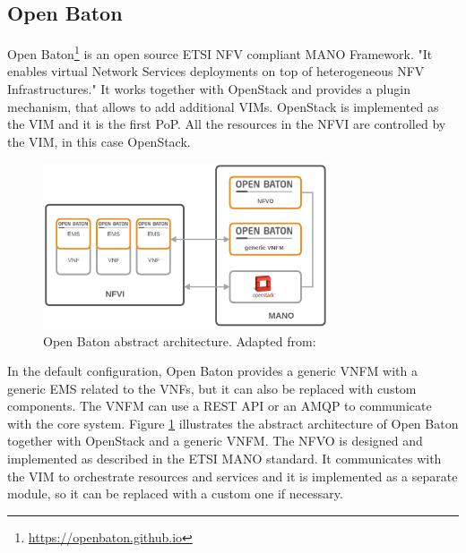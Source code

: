 \subsection{Open Baton}
Open Baton\footnote{\url{https://openbaton.github.io}} is an open source \ac{ETSI} \ac{NFV} compliant \ac{MANO} Framework\autocite[cf.]{openBatonDoc}.
"It enables virtual Network Services deployments on top of heterogeneous \ac{NFV} Infrastructures."\autocite{openBatonDoc}
It works together with OpenStack and provides a plugin mechanism, that allows to add additional \acp{VIM}.\autocite[cf.]{openBatonDoc}
OpenStack is implemented as the \ac{VIM} and it is the first \ac{PoP}.\autocite{openBatonDoc}
All the resources in the \ac{NFVI} are controlled by the \ac{VIM}, in this case OpenStack.

\begin{figure}[H]
    \centering
    \includegraphics[width=0.75\textwidth]{resources/images/open_baton_simple_architecture.png}
    \caption[Open Baton abstract architecture]{Open Baton abstract architecture. Adapted from: \autocite{openBatonDoc}}
    \label{fig:open_baton_abstract_architecture}
\end{figure}

In the default configuration, Open Baton provides a generic \ac{VNFM} with a generic \ac{EMS} related to the \acp{VNF}, but it can also be replaced with custom components.
The \ac{VNFM} can use a \ac{REST} \ac{API} or an \ac{AMQP} to communicate with the core system.
Figure \ref{fig:open_baton_abstract_architecture} illustrates the abstract architecture of Open Baton together with OpenStack and a generic \ac{VNFM}.
The \ac{NFVO} is designed and implemented as described in the \ac{ETSI} \ac{MANO} standard.\autocite[cf.]{openBatonDoc}
It communicates with the \ac{VIM} to orchestrate resources and services and it is implemented as a separate module, so it can be replaced with a custom one if necessary.

